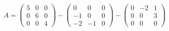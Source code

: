 \documentclass[preview]{standalone}
\begin{document}
\begin{align*}
A = \begin{pmatrix} 5 & 0 & 0 \\ 0 & 6 & 0 \\ 0 & 0 & 4 \end{pmatrix} - \begin{pmatrix} 0 & 0 & 0 \\ -1 & 0 & 0 \\ -2 & -1 & 0 \end{pmatrix} - \begin{pmatrix} 0 & -2 & 1 \\ 0 & 0 & 3 \\ 0 & 0 & 0 \end{pmatrix}
\end{align*}
\end{document}
